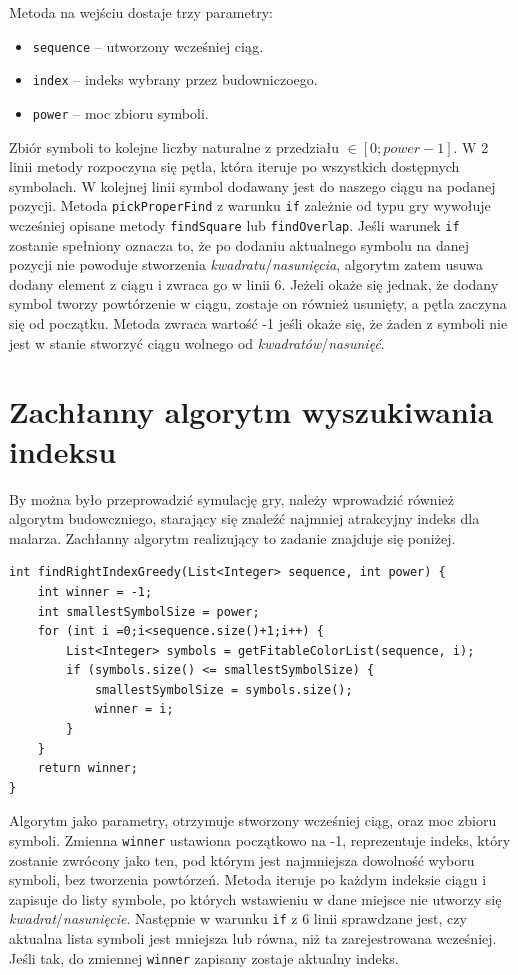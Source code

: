 \documentclass[document]{xmgr}
\begin{document}
Metoda na wejściu dostaje trzy parametry:
\begin{itemize}
\item \texttt{sequence} -- utworzony wcześniej ciąg.
\item \texttt{index} -- indeks wybrany przez budowniczoego.
\item \texttt{power} -- moc zbioru symboli.
\end{itemize}
Zbiór symboli to kolejne liczby naturalne z przedziału  $\in [0; power-1]$. W 2 linii metody rozpoczyna się pętla, która iteruje po wszystkich dostępnych symbolach. W kolejnej linii symbol dodawany jest do naszego ciągu na podanej pozycji. Metoda \texttt{pickProperFind} z warunku \texttt{if} zależnie od typu gry wywołuje wcześniej opisane metody \texttt{findSquare} lub \texttt{findOverlap}. Jeśli warunek \texttt{if} zostanie spełniony oznacza to, że po dodaniu aktualnego symbolu na danej pozycji nie powoduje stworzenia \emph{kwadratu}/\emph{nasunięcia}, algorytm zatem usuwa dodany element z ciągu i zwraca go w linii 6. Jeżeli  okaże się jednak, że dodany symbol tworzy powtórzenie w ciągu, zostaje on również usunięty, a pętla zaczyna się od początku. Metoda zwraca wartość -1 jeśli okaże się, że żaden z symboli nie jest w stanie stworzyć ciągu wolnego od \emph{kwadratów}/\emph{nasunięć}.

\section{Zachłanny algorytm wyszukiwania indeksu}
By można było przeprowadzić symulację gry, należy wprowadzić również algorytm budowczniego, starający się znaleźć najmniej atrakcyjny indeks dla malarza. Zachłanny algorytm realizujący to zadanie znajduje się poniżej.

\begin{lstlisting}[frame=single]
int findRightIndexGreedy(List<Integer> sequence, int power) {
	int winner = -1;
	int smallestSymbolSize = power;
	for (int i =0;i<sequence.size()+1;i++) {
		List<Integer> symbols = getFitableColorList(sequence, i);
		if (symbols.size() <= smallestSymbolSize) {
			smallestSymbolSize = symbols.size();
			winner = i;
		}
	}
	return winner;
}
\end{lstlisting}

Algorytm jako parametry, otrzymuje stworzony wcześniej ciąg, oraz moc zbioru symboli. Zmienna \texttt{winner} ustawiona początkowo na -1, reprezentuje indeks, który zostanie zwrócony jako ten, pod którym jest najmniejsza dowolność wyboru symboli, bez tworzenia powtórzeń. Metoda iteruje po każdym indeksie ciągu i zapisuje do listy symbole, po których wstawieniu w dane miejsce nie utworzy się \emph{kwadrat}/\emph{nasunięcie}. Następnie w warunku \texttt{if} z 6 linii sprawdzane jest, czy aktualna lista symboli jest mniejsza lub równa, niż ta zarejestrowana wcześniej. Jeśli tak, do zmiennej \texttt{winner} zapisany zostaje aktualny indeks.
\end{document}

